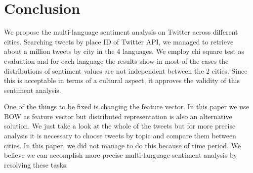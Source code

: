 \documentclass[twocolumn]{article}
\begin{document}
\vspace{-6mm}

\section{Conclusion}
\vspace{-2mm}
We propose the multi-language sentiment analysis on Twitter across different cities.
Searching tweets by place ID of Twitter API, we managed to retrieve about a million tweets by city in the 4 languages.
We employ chi square test as evaluation and for each language the results show in most of the cases the distributions of sentiment values are not independent between the 2 cities.
Since this is acceptable in terms of a cultural aspect, it approves the validity of this sentiment analysis.

One of the things to be fixed is changing the feature vector.
In this paper we use BOW as feature vector but distributed representation is also an alternative solution.
We just take a look at the whole of the tweets but for more precise analysis it is necessary to choose tweets by topic and compare them between cities.
In this paper, we did not manage to do this because of time period.
We believe we can accomplish more precise multi-language sentiment analysis by resolving these tasks.

\vspace{-6mm}


\end{document}
